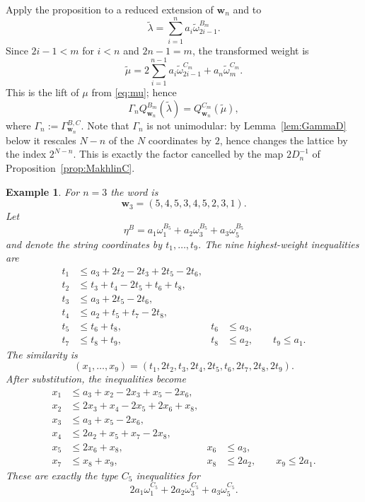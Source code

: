 \documentclass[a4paper, 12pt]{amsart}
\newtheorem{example}[theorem]{Example}
\newcommand{\ww}{\mathbf w}
\begin{document}
Apply the proposition to a reduced extension of $\ww_n$ and to
\[
       \widetilde\lambda
          =\sum_{i=1}^n a_i\widetilde\omega_{2i-1}^{B_m}.
\]
Since $2i-1<m$ for $i<n$ and $2n-1=m$, the transformed weight is
\begin{equation}\label{eq:mut}
 \widetilde\mu
  =2\sum_{i=1}^{n-1}a_i\widetilde\omega_{2i-1}^{C_m}
       +a_n\widetilde\omega_m^{C_m}.
\end{equation}
This is the lift of $\mu$ from \eqref{eq:mu}; hence
\begin{equation}\label{eq:BtoC}
 \Gamma_n Q_{\ww_n}^{B_m}(\widetilde\lambda)
       =Q_{\ww_n}^{C_m}(\widetilde\mu),
\end{equation}
where $\Gamma_n:=\Gamma_{\ww_n}^{B,C}$. Note that $\Gamma_n$ is not unimodular: by Lemma~\ref{lem:GammaD} below it rescales $N-n$ of the $N$ coordinates by $2$, hence changes the lattice by the index $2^{N-n}$. This is exactly the factor cancelled by the map $2D_n^{-1}$ of Proposition~\ref{prop:MakhlinC}.

\begin{example}\label{ex:weightsB3}
For $n=3$ the word is
\[
                 \ww_3=(5,4,5,3,4,5,2,3,1).
\]
Let
\[
      \eta^B=a_1\omega_1^{B_5}+a_2\omega_3^{B_5}+a_3\omega_5^{B_5}
\]
and denote the string coordinates by $t_1,\ldots,t_9$. The nine highest-weight inequalities are
\[
\begin{aligned}
 t_1&\leq a_3+2t_2-2t_3+2t_5-2t_6,\\
 t_2&\leq t_3+t_4-2t_5+t_6+t_8,\\
 t_3&\leq a_3+2t_5-2t_6,\\
 t_4&\leq a_2+t_5+t_7-2t_8,\\
 t_5&\leq t_6+t_8, & t_6&\leq a_3,\\
 t_7&\leq t_8+t_9, & t_8&\leq a_2,\qquad t_9\leq a_1.
\end{aligned}
\]
The similarity is
\[
 (x_1,\ldots,x_9)
  =(t_1,2t_2,t_3,2t_4,2t_5,t_6,2t_7,2t_8,2t_9).
\]
After substitution, the inequalities become
\[
\begin{aligned}
 x_1&\leq a_3+x_2-2x_3+x_5-2x_6,\\
 x_2&\leq2x_3+x_4-2x_5+2x_6+x_8,\\
 x_3&\leq a_3+x_5-2x_6,\\
 x_4&\leq2a_2+x_5+x_7-2x_8,\\
 x_5&\leq2x_6+x_8, & x_6&\leq a_3,\\
 x_7&\leq x_8+x_9, & x_8&\leq2a_2,\qquad x_9\leq2a_1.
\end{aligned}
\]
These are exactly the type $C_5$ inequalities for
\[
               2a_1\omega_1^{C_5}+2a_2\omega_3^{C_5}+a_3\omega_5^{C_5}.
\]
\end{example}
\end{document}
